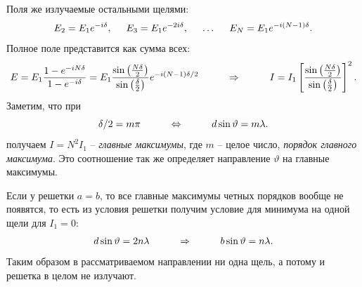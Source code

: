Поля же излучаемые остальными щелями:
\begin{equation*}
	E_2 = E_1 e^{-i \delta}, 
	\hspace{0.5 cm}
	E_3 = E_1 e^{-2i \delta},
	\hspace{0.5 cm}
	\ldots
	\hspace{0.5 cm}
	E_N = E_1 e^{- i (N-1)\delta}.
\end{equation*}
Полное поле представится как сумма всех:
\begin{equation*}
	E = E_1 \frac{1- e^{- i N \delta}}{1 - e^{-i\delta}} = E_1 \frac{\sin \left(\frac{N \delta}{2}\right)}{\sin \left(\frac{\delta}{2}\right)}e^{- i (N-1)\delta/2}
	\hspace{1 cm}
	\Rightarrow
	\hspace{1 cm}
	I = I_1 \left[\frac{\sin \left(\frac{N \delta}{2}\right)}{\sin \left(\frac{\delta}{2}\right)}\right]^2.
\end{equation*}
Заметим, что при  
\begin{equation*}
	\delta/2 = m \pi
	\hspace{1 cm}
	\Leftrightarrow
	\hspace{1 cm}
	d \sin \vartheta = m \lambda.
\end{equation*}
получаем $I = N^2 I_1$ -- \textit{главные максимумы}, где $m$ -- целое число, \textit{порядок главного максимума}. Это соотношение так же определяет направление $\vartheta$ на главные максимумы.

Если у решетки $a = b$, то все главные максимумы четных порядков вообще не появятся, то есть из условия решетки получим условие для минимума на одной щели для $I_1=0$:
\begin{equation*}
	d \sin \vartheta = 2 n \lambda
	\hspace{1 cm}
	\Rightarrow
	\hspace{1 cm}
	b \sin \vartheta = n \lambda.
\end{equation*}
Таким образом в рассматриваемом направлении ни одна щель, а потому и решетка в целом не излучают.